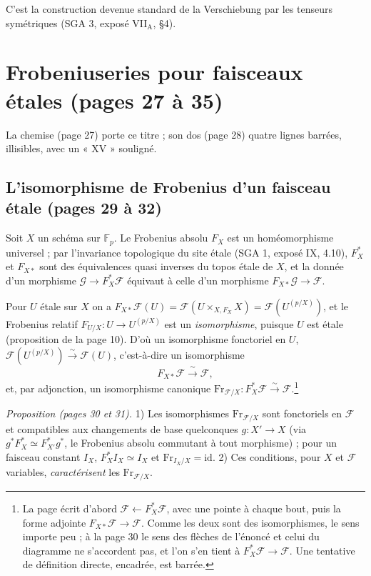 \documentclass[11pt,a4paper]{article}
\begin{document}
C'est la construction devenue standard de la Verschiebung par les tenseurs
symétriques (SGA 3, exposé VII$_{\mathrm{A}}$, §4).

\section*{Frobeniuseries pour faisceaux étales (pages 27 à 35)}

La chemise (page 27) porte ce titre ; son dos (page 28) quatre lignes barrées,
illisibles, avec un « XV » souligné.

\subsection*{L'isomorphisme de Frobenius d'un faisceau étale (pages 29 à 32)}

Soit $X$ un schéma sur $\mathbb{F}_p$. Le Frobenius absolu $F_X$ est un
homéomorphisme universel ; par l'invariance topologique du site étale (SGA 1,
exposé IX, 4.10), $F_X^{*}$ et $F_{X*}$ sont des équivalences quasi inverses
du topos étale de $X$, et la donnée d'un morphisme $\mathcal{G} \to
F_X^{*}\mathcal{F}$ équivaut à celle d'un morphisme $F_{X*}\mathcal{G} \to
\mathcal{F}$.

Pour $U$ étale sur $X$ on a $F_{X*}\mathcal{F}(U) = \mathcal{F}(U \times_{X,
F_X} X) = \mathcal{F}(U^{(p/X)})$, et le Frobenius relatif $F_{U/X} : U \to
U^{(p/X)}$ est un \emph{isomorphisme}, puisque $U$ est étale (proposition de
la page 10). D'où un isomorphisme fonctoriel en $U$, $\mathcal{F}(U^{(p/X)})
\xrightarrow{\sim} \mathcal{F}(U)$, c'est-à-dire un isomorphisme
\[
F_{X*}\mathcal{F} \xrightarrow{\ \sim\ } \mathcal{F},
\]
et, par adjonction, un isomorphisme canonique $\mathrm{Fr}_{\mathcal{F}/X} :
F_X^{*}\mathcal{F} \xrightarrow{\sim} \mathcal{F}$.\footnote{La page écrit
d'abord $\mathcal{F} \leftarrow F_X^{*}\mathcal{F}$, avec une pointe à chaque
bout, puis la forme adjointe $F_{X*}\mathcal{F} \to \mathcal{F}$. Comme les
deux sont des isomorphismes, le sens importe peu ; à la page 30 le sens des
flèches de l'énoncé et celui du diagramme ne s'accordent pas, et l'on s'en
tient à $F_X^{*}\mathcal{F} \to \mathcal{F}$. Une tentative de définition
directe, encadrée, est barrée.}

\emph{Proposition (pages 30 et 31).} 1) Les isomorphismes
$\mathrm{Fr}_{\mathcal{F}/X}$ sont fonctoriels en $\mathcal{F}$ et compatibles
aux changements de base quelconques $g : X' \to X$ (via $g^{*}F_X^{*} \simeq
F_{X'}^{*}g^{*}$, le Frobenius absolu commutant à tout morphisme) ; pour un
faisceau constant $I_X$, $F_X^{*}I_X \simeq I_X$ et $\mathrm{Fr}_{I_X/X} =
\mathrm{id}$. 2) Ces conditions, pour $X$ et $\mathcal{F}$ variables,
\emph{caractérisent} les $\mathrm{Fr}_{\mathcal{F}/X}$.
\end{document}
